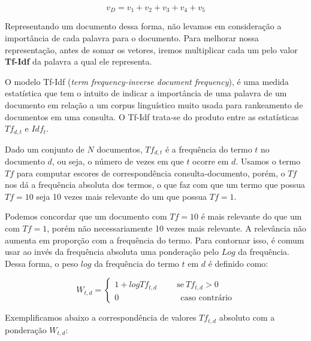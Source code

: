 \documentclass[a4paper,12pt]{article}
\begin{document}
$$v_{D} = v_{1}+v_{2}+v_{3}+v_{4}+v_{5} $$

Representando um documento dessa forma, não levamos em consideração a importância de cada palavra para o documento. Para melhorar nossa 
representação, antes de somar os vetores, iremos multiplicar cada um pelo valor \textbf{Tf-Idf} da palavra a qual ele representa.

O modelo Tf-Idf (\textit{term frequency-inverse document frequency}), é uma medida estatística que tem o intuito de indicar
a importância de uma palavra de um documento em relação a um corpus linguístico muito usada para rankeamento de documentos em uma consulta. O Tf-Idf trata-se do produto entre as estatísticas $Tf_{d,t}$ e
$Idf_{t}$.


  Dado um conjunto de $N$ documentos, $Tf_{d,t}$ é a frequência do termo $t$ no documento
  $d$, ou seja, o número de vezes em que $t$ ocorre em $d$. Usamos o termo $Tf$ para computar escores de correspondência consulta-documento,
  porém, o $Tf$ nos dá a frequência absoluta dos termos, o que faz com que um termo que possua $Tf=10$ seja 10 vezes mais relevante do um que possua
  $Tf=1$. 
  
  Podemos concordar que um documento com $Tf=10$ é mais relevante do que um com $Tf=1$, porém não necessariamente 10 vezes mais relevante.
  A relevância não aumenta em proporção com a frequência do termo. Para contornar isso, é comum usar ao invés da frequência absoluta uma ponderação
  pelo $Log$ da frequência. Dessa forma, o peso $log$ da frequência do termo $t$ em $d$ é definido como:
  
  \begin{equation}
   W_{t,d}=\begin{cases}
             1 + logTf_{t,d}  \hspace{1cm} \text{se} \ Tf_{t,d} > 0 \\
             0 \ \hspace{3cm} \text{caso contrário}
            \end{cases}
  \end{equation}

 
 
 Exemplificamos abaixo a correspondência de valores $Tf_{t,d}$ absoluto com a ponderação $W_{t,d}$:
 
\end{document}
